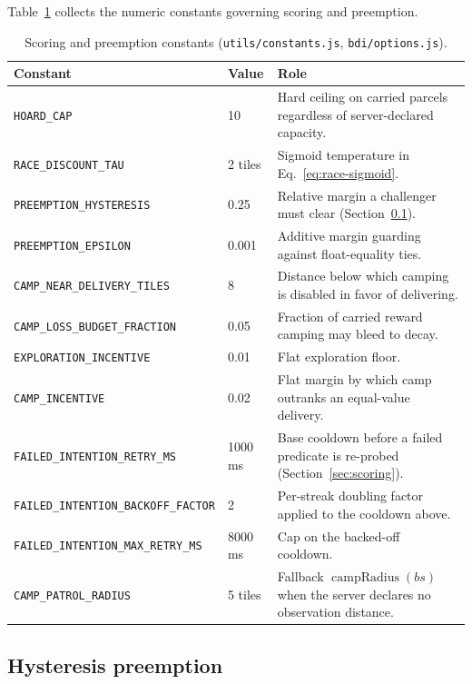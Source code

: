 \documentclass[11pt,a4paper]{article}
\begin{document}
Table~\ref{tab:constants} collects the numeric constants governing scoring and preemption.

\begin{table}[htbp]
\centering
\footnotesize
\begin{tabular}{@{}llp{7.2cm}@{}}
\toprule
\textbf{Constant} & \textbf{Value} & \textbf{Role} \\
\midrule
\texttt{HOARD\_CAP} & 10 & Hard ceiling on carried parcels regardless of server-declared capacity. \\
\texttt{RACE\_DISCOUNT\_TAU} & 2 tiles & Sigmoid temperature in Eq.~\ref{eq:race-sigmoid}. \\
\texttt{PREEMPTION\_HYSTERESIS} & 0.25 & Relative margin a challenger must clear (Section~\ref{sec:hysteresis}). \\
\texttt{PREEMPTION\_EPSILON} & 0.001 & Additive margin guarding against float-equality ties. \\
\texttt{CAMP\_NEAR\_DELIVERY\_TILES} & 8 & Distance below which camping is disabled in favor of delivering. \\
\texttt{CAMP\_LOSS\_BUDGET\_FRACTION} & 0.05 & Fraction of carried reward camping may bleed to decay. \\
\texttt{EXPLORATION\_INCENTIVE} & 0.01 & Flat exploration floor. \\
\texttt{CAMP\_INCENTIVE} & 0.02 & Flat margin by which camp outranks an equal-value delivery. \\
\texttt{FAILED\_INTENTION\_RETRY\_MS} & 1000\,ms & Base cooldown before a failed predicate is re-probed (Section~\ref{sec:scoring}). \\
\texttt{FAILED\_INTENTION\_BACKOFF\_FACTOR} & 2 & Per-streak doubling factor applied to the cooldown above. \\
\texttt{FAILED\_INTENTION\_MAX\_RETRY\_MS} & 8000\,ms & Cap on the backed-off cooldown. \\
\texttt{CAMP\_PATROL\_RADIUS} & 5 tiles & Fallback \(\operatorname{campRadius}(bs)\) when the server declares no observation distance. \\
\bottomrule
\end{tabular}
\caption{Scoring and preemption constants (\texttt{utils/constants.js}, \texttt{bdi/options.js}).}
\label{tab:constants}
\end{table}

\subsection{Hysteresis preemption}
\label{sec:hysteresis}
\end{document}
